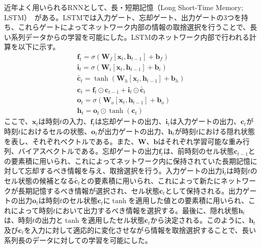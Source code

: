 \documentclass[12pt]{jarticle}
\numberwithin{equation}{section}    %
\numberwithin{figure}{section}      %
\numberwithin{table}{section}      %
\begin{document}
近年よく用いられるRNNとして、長・短期記憶（Long Short-Time Memory; LSTM）~\cite{hochreiter1997long}がある。LSTMでは入力ゲート、忘却ゲート、出力ゲートの3つを持ち、これらゲートによってネットワーク内部の情報の取捨選択を行うことで、長い系列データからの学習を可能にした。LSTMのネットワーク内部で行われる計算を以下に示す。
\begin{gather}
    \bm{f}_{t} = \sigma(\bm{W}_{f}[\bm{x}_{t}, \bm{h}_{t-1}] + \bm{b}_{f}) \\
    \bm{i}_{t} = \sigma(\bm{W}_{i}[\bm{x}_{t}, \bm{h}_{t-1}] + \bm{b}_{i}) \\
    \tilde{\bm{c}_{t}} = \tanh (\bm{W}_{h}[\bm{x}_{t}, \bm{h}_{t-1}] + \bm{b}_{h}) \\
    \bm{c}_{t} = \bm{f}_{t} \odot \bm{c}_{t-1} + \bm{i}_{t} \odot \tilde{\bm{c}_{t}} \\
    \bm{o}_{t} = \sigma(\bm{W}_{o}[\bm{x}_{t}, \bm{h}_{t-1}] + \bm{b}_{o}) \\
    \bm{h}_{t} = \bm{o}_{t} \odot \tanh(\bm{c}_{t})
\end{gather}
ここで、$\bm{x}_{t}$は時刻$t$の入力、$\bm{f}_{t}$は忘却ゲートの出力、$\bm{i}_{t}$は入力ゲートの出力、$\bm{c}_{t}$が時刻$t$におけるセルの状態、$\bm{o}_{t}$が出力ゲートの出力、$\bm{h}_{t}$が時刻$t$における隠れ状態を表し、それぞれベクトルである。また、$\bm{W}$、$\bm{b}$はそれぞれ学習可能な重み行列、バイアスベクトルである。忘却ゲートの出力$\bm{f}_{t}$は、前時刻のセル状態$\bm{c}_{t-1}$との要素積に用いられ、これによってネットワーク内に保持されていた長期記憶に対して忘却するべき情報を与え、取捨選択を行う。入力ゲートの出力$\bm{i}_{t}$は時刻$t$のセル状態の候補となる$\tilde{\bm{c}_{t}}$との要素積に用いられ、これによって新たにネットワークが長期記憶するべき情報が選択され、セル状態$\bm{c}_{t}$として保持される。出力ゲートの出力$\bm{o}_{t}$は時刻$t$のセル状態$\bm{c}_{t}$に$\tanh$を適用した値との要素積に用いられ、これによって時刻$t$において出力するべき情報を選択する。最後に、隠れ状態$\bm{h}_{t}$は、時刻$t$の出力と$\tanh$を適用したセル状態$\bm{c}_{t}$から決定される。このように、$\bm{h}_{t}$及び$\bm{c}_{t}$を入力に対して適応的に変化させながら情報を取捨選択することで、長い系列長のデータに対しての学習を可能にした。
\end{document}
